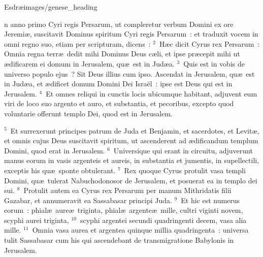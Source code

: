 {Esdræ}{images/genese_heading}


\bchapter
{}n anno primo Cyri regis Persarum, ut compleretur verbum Domini ex ore Jeremi\ae , suscitavit Dominus spiritum Cyri regis Persarum~: et traduxit vocem in omni regno suo, etiam per scripturam, dicens~:
${}^{2}$~H\ae c dicit Cyrus rex Persarum~: Omnia regna terr\ae\ dedit mihi Dominus Deus c\ae li, et ipse pr\ae cepit mihi ut \ae dificarem ei domum in Jerusalem, qu\ae\ est in Jud\ae a.
${}^{3}$~Quis est in vobis de universo populo ejus~? Sit Deus illius cum ipso. Ascendat in Jerusalem, qu\ae\ est in Jud\ae a, et \ae dificet domum Domini Dei Isra\"el~: ipse est Deus qui est in Jerusalem.
${}^{4}$~Et omnes reliqui in cunctis locis ubicumque habitant, adjuvent eum viri de loco suo argento et auro, et substantia, et pecoribus, excepto quod voluntarie offerunt templo Dei, quod est in Jerusalem.


${}^{5}$~Et surrexerunt principes patrum de Juda et Benjamin, et sacerdotes, et Levit\ae , et omnis cujus Deus suscitavit spiritum, ut ascenderent ad \ae dificandum templum Domini, quod erat in Jerusalem.
${}^{6}$~Universique qui erant in circuitu, adjuverunt manus eorum in vasis argenteis et aureis, in substantia et jumentis, in supellectili, exceptis his qu\ae\ sponte obtulerant.
${}^{7}$~Rex quoque Cyrus protulit vasa templi Domini, qu\ae\ tulerat Nabuchodonosor de Jerusalem, et posuerat ea in templo dei sui.
${}^{8}$~Protulit autem ea Cyrus rex Persarum per manum Mithridatis filii Gazabar, et annumeravit ea Sassabasar principi Juda.
${}^{9}$~Et hic est numerus eorum~: phial\ae\ aure\ae\ triginta, phial\ae\ argente\ae\ mille, cultri viginti novem, scyphi aurei triginta,
${}^{10}$~scyphi argentei secundi quadringenti decem, vasa alia mille.
${}^{11}$~Omnia vasa aurea et argentea quinque millia quadringenta~: universa tulit Sassabasar cum his qui ascendebant de transmigratione Babylonis in Jerusalem.

